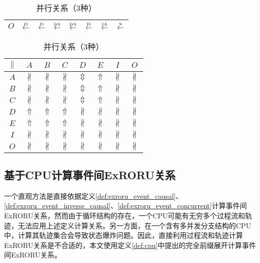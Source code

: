 \begin{table}[htbp]
\begin{subtable}{0.45\textwidth}
\begin{tabular}{|c|c|c|c|c|c|c|c|}
		$O$ & $\overset{\text{\tiny{IS}}}{\leftarrow}$ & $\overset{\text{\tiny{IS}}}{\leftarrow}$ & $\overset{\text{\tiny{DA}}}{\leftarrow}$ & $\overset{\text{\tiny{DA}}}{\leftarrow}$ & $\overset{\text{\tiny{IS}}}{\leftarrow}$ & $\overset{\text{\tiny{IA}}}{\leftarrow}$ & $\overset{\text{\tiny{N}}}{\leftarrow}$\\ \hline
	\end{tabular}
  \end{subtable}
  \begin{subtable}{\textwidth}
  	\vspace{1em}
    \centering
    \caption{并行关系（3种）}
	\begin{tabular}{|c|c|c|c|c|c|c|c|} \hline
		$\parallel$ & $A$ & $B$ & $C$ & $D$ & $E$ & $I$ & $O$\\ \hline
		$A$ & $\nparallel$ & $\nparallel$ & $\nparallel$ & $\Updownarrow$ & $\Uparrow$ & $\nparallel$ & $\nparallel$\\ \hline
		$B$ & $\nparallel$ & $\nparallel$ & $\nparallel$ & $\Updownarrow$ & $\Uparrow$ & $\nparallel$ & $\nparallel$\\ \hline
		$C$ & $\nparallel$ & $\nparallel$ & $\nparallel$ & $\Updownarrow$ & $\Uparrow$ & $\nparallel$ & $\nparallel$\\ \hline
		$D$ & $\Uparrow$ & $\Uparrow$ & $\Uparrow$ & $\nparallel$ & $\nparallel$ & $\nparallel$ & $\nparallel$\\ \hline
		$E$ & $\Uparrow$ & $\Uparrow$ & $\Uparrow$ & $\nparallel$ & $\nparallel$ & $\nparallel$ & $\nparallel$\\ \hline
		$I$ & $\nparallel$ & $\nparallel$ & $\nparallel$ & $\nparallel$ & $\nparallel$ & $\nparallel$ & $\nparallel$\\ \hline
		$O$ & $\nparallel$ & $\nparallel$ & $\nparallel$ & $\nparallel$ & $\nparallel$ & $\nparallel$ & $\nparallel$\\ \hline
	\end{tabular}
  \end{subtable}
\end{table}

\subsection{基于CPU计算事件间ExRORU关系}\label{subsec:exroru_event_computation}
一个直观方法是直接依据定义\ref{def:exroru_event_causal}、\ref{def:exroru_event_inverse_causal}、\ref{def:exroru_event_concurrent}计算事件间ExRORU关系，然而由于循环结构的存在，一个CPU可能有无穷多个过程流和轨迹，无法应用上述定义计算关系。另一方面，在一个含有多并发分支结构的CPU中，计算其轨迹集合会导致状态爆炸问题。因此，直接利用过程流和轨迹计算ExRORU关系是不合适的，本文使用定义\ref{def:cpu}中提出的完全前缀展开计算事件间ExRORU关系。

